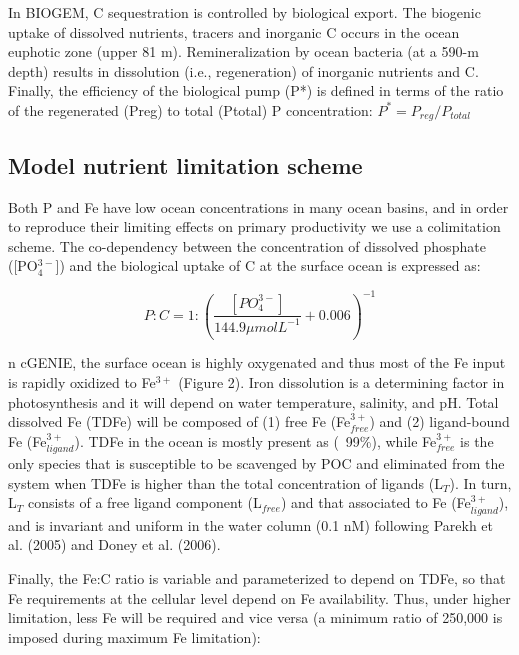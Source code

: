 In BIOGEM, C sequestration is controlled by biological export. The biogenic uptake of dissolved nutrients, tracers and inorganic C occurs in the ocean euphotic zone (upper 81 m). Remineralization by ocean bacteria (at a 590-m depth) results in dissolution (i.e., regeneration) of inorganic nutrients and C. Finally, the efficiency of the biological pump (P*) is defined in terms of the ratio of the regenerated (Preg) to total (Ptotal) P concentration: $P^{*} = P_{reg}/P_{total}$

\subsection{Model nutrient limitation scheme}

Both P and Fe have low ocean concentrations in many ocean basins, and in order to reproduce their limiting effects on primary productivity we use a colimitation scheme. The co-dependency between the concentration of dissolved phosphate ([PO$_4^{3-}$]) and the biological uptake of C at the surface ocean is expressed as:

\begin{linenomath*}
\begin{equation}
    P:C=1:\left(\frac{[PO_4^{3-}]}{144.9 \mu mol L^{-1}} + 0.006\right)^{-1}
\end{equation}
\end{linenomath*}

n cGENIE, the surface ocean is highly oxygenated and thus most of the Fe input is rapidly oxidized to Fe$^{3+}$ (Figure 2). Iron dissolution is a determining factor in photosynthesis and it will depend on water temperature, salinity, and pH. Total dissolved Fe (TDFe) will be composed of (1) free Fe (Fe$^{3+}_{free}$) and (2) ligand-bound Fe (Fe$^{3+}_{ligand}$). TDFe in the ocean is mostly present as  (~99\%), while Fe$^{3+}_{free}$ is the only species that is susceptible to be scavenged by POC and eliminated from the system when TDFe  is higher than the total concentration of ligands (L$_T$). In turn, L$_T$ consists of a free ligand component (L$_{free}$) and that associated to Fe (Fe$^{3+}_{ligand}$), and is invariant and uniform in the water column (0.1 nM) following Parekh et al. (2005) and Doney et al. (2006).

Finally, the Fe:C ratio is variable and parameterized to depend on TDFe, so that Fe requirements at the cellular level depend on Fe availability. Thus, under higher limitation, less Fe will be required and vice versa (a minimum ratio of 250,000 is imposed during maximum Fe limitation): 

